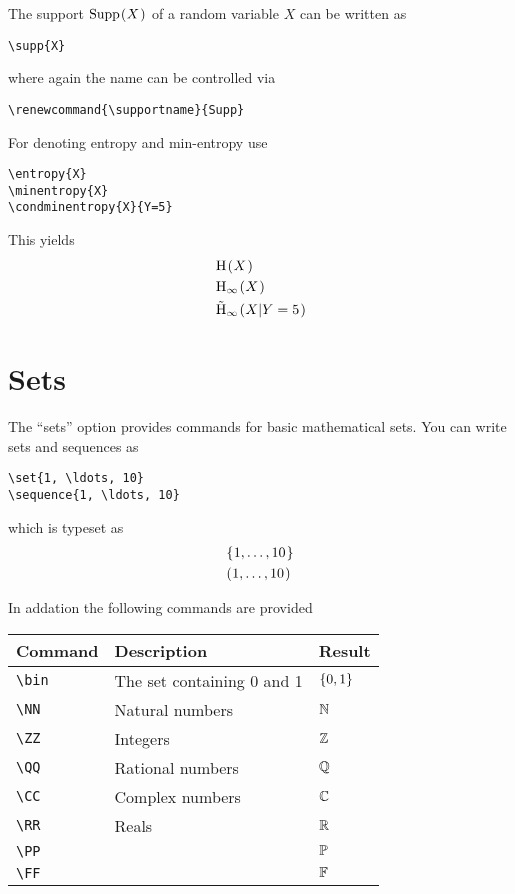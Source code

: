 \documentclass[a4paper]{report}
\begin{document}
The support $\supp{X}$ of a random variable $X$ can be written as
\begin{lstlisting}
\supp{X}
\end{lstlisting}
where again the name can be controlled via
\begin{lstlisting}
\renewcommand{\supportname}{Supp}
\end{lstlisting}

For denoting entropy and min-entropy use
\begin{lstlisting}
\entropy{X}
\minentropy{X}
\condminentropy{X}{Y=5}
\end{lstlisting}
This yields 
\begin{align*}
& \entropy{X} \\
& \minentropy{X} \\
& \condminentropy{X}{Y=5}
\end{align*}

\section{Sets}
The \enquote{sets} option provides commands for basic mathematical sets.
You can write sets and sequences as
\begin{lstlisting}
\set{1, \ldots, 10}
\sequence{1, \ldots, 10}
\end{lstlisting}
which is typeset as
\begin{align*}
& \set{1, \ldots, 10} \\
& \sequence{1, \ldots, 10}
\end{align*}

In addation the following commands are provided
\begin{center}
\begin{tabular}{l l l}
\textbf{Command} & \textbf{Description} & \textbf{Result} \\\hline
\lstinline$\bin$ & The set containing 0 and 1 & $\{0,1\}$  \\
\lstinline$\NN$ & Natural numbers & $\mathbb{N}$  \\
\lstinline$\ZZ$ & Integers & $\mathbb{Z}$  \\
\lstinline$\QQ$ & Rational numbers & $\mathbb{Q}$  \\
\lstinline$\CC$ & Complex numbers & $\mathbb{C}$  \\
\lstinline$\RR$ & Reals & $\mathbb{R}$  \\
\lstinline$\PP$ & & $\mathbb{P}$  \\
\lstinline$\FF$ & & $\mathbb{F}$  \\
\end{tabular}
\end{center}
\end{document}
